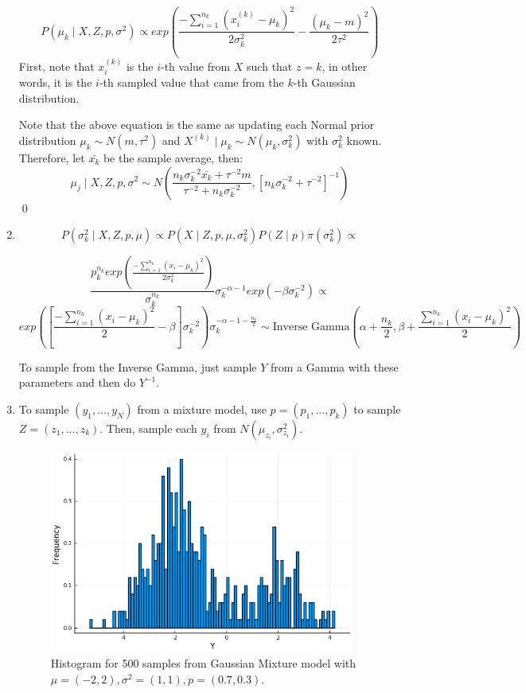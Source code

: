 \documentclass[12pt,letterpaper]{article}
\begin{document}
\begin{enumerate}[leftmargin=!,labelindent=5pt]
$$
P(\mu_k \mid X, Z, p, \sigma^2) \propto
exp \left(
	\frac{-\sum_{i=1}^{n_k}(x_i^{(k)} - \mu_k)^2}{2\sigma_k^2} -
	\frac{(\mu_k - m)^2}{2\tau^2}
\right)
$$
First, note that $x_i^{(k)}$ is the $i$-th value from $X$ such
that $z = k$, in other words, it is the $i$-th sampled value that came
from the $k$-th Gaussian distribution.

Note that the above equation is the same as updating each
Normal
prior distribution $\mu_k \sim N(m, \tau^2)$ and
$X^{(k)} \mid \mu_k \sim N(\mu_k, \sigma^2_k)$ with $\sigma^2_k$ known.
Therefore, let $\bar{x_k}$ be the sample average, then:
$$\mu_j \mid X, Z, p,\sigma^2
\sim N\left(
\frac{n_k \sigma_k ^{-2}\bar{x_k} + \tau^{-2}m}
{\tau^{-2} + n_k\sigma^{-2}_k}
, [n_k\sigma_k^{-2} + \tau^{-2}]^{-1}
\right)$$
\qed

\item 

$$
P(\sigma_k ^2 \mid X, Z, p, \mu) \propto
P(X \mid Z, p, \mu, \sigma_k^2) P(Z \mid p) \pi(\sigma_k^2)
\propto
$$

$$
\frac{p_k^{n_k} exp\left(
	\frac{-\sum_{i=1}^{n_k}(x_i - \mu_k)^2}{2\sigma^2_k}
\right)}
{\sigma_k^{n_k}}
\sigma_k^{-\alpha -1}exp(-\beta \sigma_k^{-2}) \propto
$$
$$
exp \left( 
\left [
	\frac{-\sum_{i=1}^{n_k}(x_i - \mu_k)^2}{2}
	- \beta
\right] \sigma_k^{-2}
\right)
\sigma_k^{-\alpha -1 - \frac{n_k}{2}} \sim
\text{Inverse Gamma}\left(
\alpha + \frac{n_k}{2}, \beta +
\frac{\sum_{i=1}^{n_k}(x_i - \mu_k)^2}{2}
\right)
$$

To sample from the Inverse Gamma, just sample $Y$ from a Gamma with these
parameters and then do $Y^{-1}$.

\item To sample $(y_1,...,y_N)$ from a mixture model,
use $p = (p_1,...,p_k)$ to sample $Z = (z_1,...,z_k)$. Then,
sample each $y_i$ from $N(\mu_{z_i},\sigma^2_{z_i})$.
\begin{figure}[H]
    \centering
    \includegraphics[width=10cm]{images/Ex6.png}
    \caption{Histogram for 500 samples from
    Gaussian Mixture model with
    $\mu = (-2, 2),\sigma^2 =(1,1), p = (0.7,0.3)$.
    }
    \label{fig:1}
\end{figure}


\end{enumerate}
\end{document}
